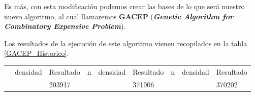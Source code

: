 Es más, con esta modificación podemos crear las bases de lo que será nuestro nuevo algoritmo, al cual llamaremos \textbf{GACEP} (\textbf{\textit{Genetic Algorithm for Combinatory Expensive Problem}}). 

Los resultados de la ejecución de este algoritmo vienen recopilados en la tabla \ref{GACEP_Historico}.

\begin{table}[]
\begin{tabular}{|cclccllll}
\hline
\rowcolor[HTML]{FFFFC7} 
\multicolumn{9}{|c|}{\cellcolor[HTML]{FFFFC7}GACEP}                                                                                                                                                                                                                                                                                                                                                                                                                                                                                                                                                                                    \\ \hline
\rowcolor[HTML]{F7EAC7} 
\multicolumn{1}{|c|}{\cellcolor[HTML]{F7EAC7}n}                               & \multicolumn{1}{c|}{\cellcolor[HTML]{F7EAC7}densidad}              & \multicolumn{1}{c|}{\cellcolor[HTML]{F7EAC7}Resultado} & \multicolumn{1}{c|}{\cellcolor[HTML]{F7EAC7}n}                               & \multicolumn{1}{c|}{\cellcolor[HTML]{F7EAC7}densidad}               & \multicolumn{1}{c|}{\cellcolor[HTML]{F7EAC7}Resultado} & \multicolumn{1}{c|}{\cellcolor[HTML]{F7EAC7}n}                               & \multicolumn{1}{c|}{\cellcolor[HTML]{F7EAC7}densidad}              & \multicolumn{1}{c|}{\cellcolor[HTML]{F7EAC7}Resultado} \\ \hline
\rowcolor[HTML]{DAE8FC} 
\multicolumn{1}{|c|}{\cellcolor[HTML]{FFFFC7}}                                & \multicolumn{1}{c|}{\cellcolor[HTML]{DAE8FC}}                      & \multicolumn{1}{l|}{\cellcolor[HTML]{DAE8FC}203917}    & \multicolumn{1}{c|}{\cellcolor[HTML]{FFFFC7}}                                & \multicolumn{1}{c|}{\cellcolor[HTML]{DAE8FC}}                       & \multicolumn{1}{l|}{\cellcolor[HTML]{DAE8FC}371906}    & \multicolumn{1}{c|}{\cellcolor[HTML]{FFFFC7}}                                & \multicolumn{1}{c|}{\cellcolor[HTML]{DAE8FC}}                      & \multicolumn{1}{l|}{\cellcolor[HTML]{DAE8FC}370202}    \\ \cline{3-3} \cline{6-6} \cline{9-9} 

\end{tabular}
\end{table}
